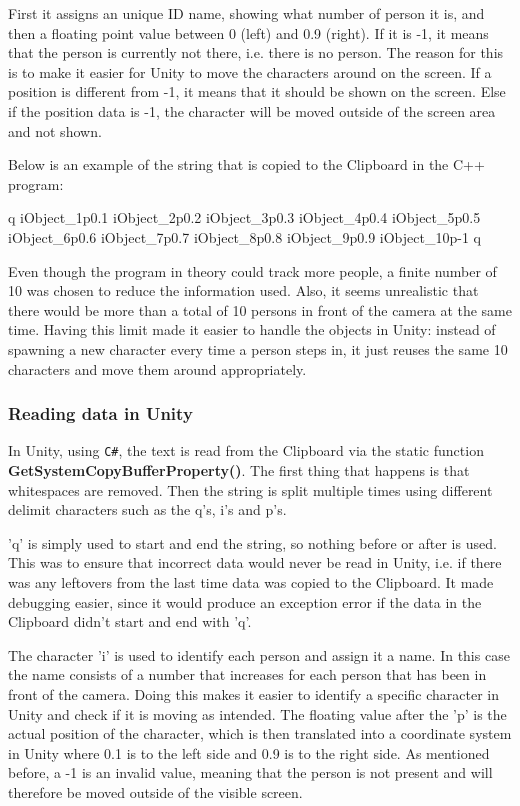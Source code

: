First it assigns an unique ID name, showing what number of person it is, and then a floating point value between 0 (left) and 0.9 (right). If it is -1, it means that the person is currently not there, i.e. there is no person. The reason for this is to make it easier for Unity to move the characters around on the screen. If a position is different from -1, it means that it should be shown on the screen. Else if the position data is -1, the character will be moved outside of the screen area and not shown.

Below is an example of the string that is copied to the Clipboard in the C++ program:

q iObject\_1p0.1 iObject\_2p0.2 iObject\_3p0.3 iObject\_4p0.4 iObject\_5p0.5 iObject\_6p0.6 iObject\_7p0.7 iObject\_8p0.8 iObject\_9p0.9 iObject\_10p-1 q

Even though the program in theory could track more people, a finite number of 10 was chosen to reduce the information used. Also, it seems unrealistic that there would be more than a total of 10 persons in front of the camera at the same time. Having this limit made it easier to handle the objects in Unity: instead of spawning a new character every time a person steps in, it just reuses the same 10 characters and move them around appropriately.

\subsubsection{Reading data in Unity}
In Unity, using \texttt{C\#}, the text is read from the Clipboard via the static function \textbf{GetSystemCopyBufferProperty()}. The first thing that happens is that whitespaces are removed. Then the string is split multiple times using different delimit characters such as the q's, i's and p's.

'q' is simply used to start and end the string, so nothing before or after is used. This was to ensure that incorrect data would never be read in Unity, i.e. if there was any leftovers from the last time data was copied to the Clipboard. It made debugging easier, since it would produce an exception error if the data in the Clipboard didn't start and end with 'q'.

The character 'i' is used to identify each person and assign it a name. In this case the name consists of a number that increases for each person that has been in front of the camera. Doing this makes it easier to identify a specific character in Unity and check if it is moving as intended. The floating value after the 'p' is the actual position of the character, which is then translated into a coordinate system in Unity where 0.1 is to the left side and 0.9 is to the right side. As mentioned before, a -1 is an invalid value, meaning that the person is not present and will therefore be moved outside of the visible screen.

